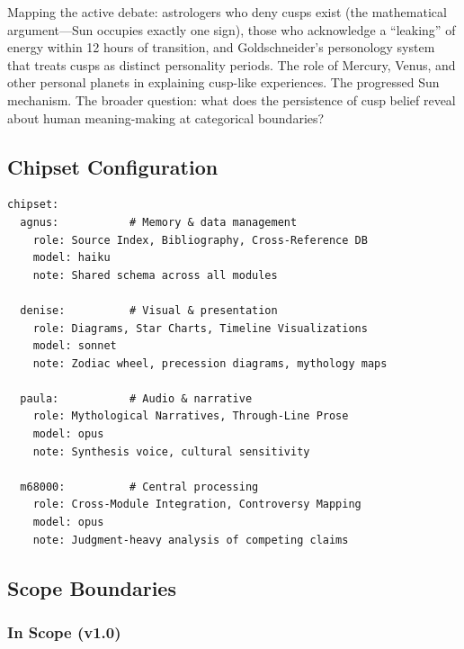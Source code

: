 \documentclass[11pt,letterpaper]{article}
\begin{document}
Mapping the active debate: astrologers who deny cusps exist (the mathematical argument---Sun occupies exactly one sign), those who acknowledge a ``leaking'' of energy within 12 hours of transition, and Goldschneider's personology system that treats cusps as distinct personality periods. The role of Mercury, Venus, and other personal planets in explaining cusp-like experiences. The progressed Sun mechanism. The broader question: what does the persistence of cusp belief reveal about human meaning-making at categorical boundaries?

\subsection{Chipset Configuration}

\begin{asciibox}
\begin{verbatim}
chipset:
  agnus:           # Memory & data management
    role: Source Index, Bibliography, Cross-Reference DB
    model: haiku
    note: Shared schema across all modules

  denise:          # Visual & presentation
    role: Diagrams, Star Charts, Timeline Visualizations
    model: sonnet
    note: Zodiac wheel, precession diagrams, mythology maps

  paula:           # Audio & narrative
    role: Mythological Narratives, Through-Line Prose
    model: opus
    note: Synthesis voice, cultural sensitivity

  m68000:          # Central processing
    role: Cross-Module Integration, Controversy Mapping
    model: opus
    note: Judgment-heavy analysis of competing claims
\end{verbatim}
\end{asciibox}

\subsection{Scope Boundaries}

\subsubsection{In Scope (v1.0)}
\end{document}
